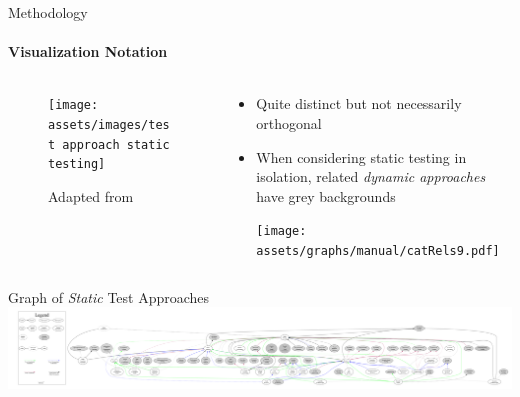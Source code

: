 \documentclass{beamer}
\begin{document}
\begin{frame}{Methodology}
    \framesubtitle{Visualization Notation}
    \begin{columns}[c]
        \begin{column}{.4\textwidth}
            \begin{figure}
                \centering
                \texttt{[image: assets/images/test approach static testing]}
                \caption{\tiny Adapted from \citep[Fig.~2]{IEEE2022}}
            \end{figure}
        \end{column}
        \begin{column}{.6\textwidth}
            \begin{itemize}
                \item \pause Quite distinct but not necessarily orthogonal
                \item \pause When considering static testing in isolation,
                      related \emph{dynamic approaches} have grey backgrounds

                      \vspace{-0.5cm}
                      \texttt{[image: assets/graphs/manual/catRels9.pdf]}
            \end{itemize}
        \end{column}
    \end{columns}
\end{frame}

\begin{frame}{Graph of \emph{Static} Test Approaches}
    \includegraphics[width=\textwidth]{assets/graphs/staticGraph.pdf}
\end{frame}
\end{document}
